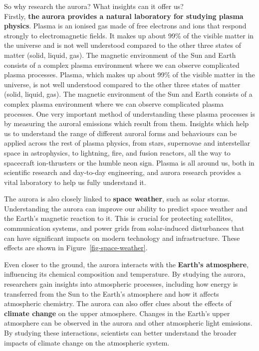 \documentclass{article}
\newcommand{\contributed}[1]{%
    \par\noindent
    \begingroup
    \setlength{\leftskip}{1em}%
    \itshape
    Contributors: #1
    \par
    \endgroup
    \vspace{0.5em}
}
\begin{document}
So why research the aurora? What insights can it offer us?\\
Firstly, \textbf{the aurora provides a natural laboratory for studying plasma physics}.
Plasma is an ionised gas made of free electrons and ions that respond strongly to electromagnetic fields. It makes up about 99\% of the visible matter in the universe and is not well understood compared to the other three states of matter (solid, liquid, gas). The magnetic environment of the Sun and Earth consists of a complex plasma environment where we can observe complicated plasma processes.
Plasma, which makes up about 99\% of the visible matter in the universe, is not well understood compared to the other three states of matter (solid, liquid, gas). The magnetic environment of the Sun and Earth consists of a complex plasma environment where we can observe complicated plasma processes. One very important method of understanding these plasma processes is by measuring the auroral emissions which result from them. Insights which help us to understand the range of different auroral forms and behaviours can be applied across the rest of plasma physics, from stars, supernovae and interstellar space in astrophysics, to lightning, fire, and fusion reactors, all the way to spacecraft ion-thrusters or the humble neon sign. Plasma is all around us, both in scientific research and day-to-day engineering, and aurora research provides a vital laboratory to help us fully understand it.

The aurora is also closely linked to \textbf{space weather}, such as solar storms. Understanding the aurora can improve our ability to predict space weather and the Earth's magnetic reaction to it. This is crucial for protecting satellites, communication systems, and power grids from solar-induced disturbances that can have significant impacts on modern technology and infrastructure. These effects are shown in Figure~\ref{fig-space-weather}.

Even closer to the ground, the aurora interacts with the \textbf{Earth's atmosphere}, influencing its chemical composition and temperature. By studying the aurora, researchers gain insights into atmospheric processes, including how energy is transferred from the Sun to the Earth's atmosphere and how it affects atmospheric chemistry. The aurora can also offer clues about the effects of \textbf{climate change} on the upper atmosphere. Changes in the Earth's upper atmosphere can be observed in the aurora and other atmospheric light emissions. By studying these interactions, scientists can better understand the broader impacts of climate change on the atmospheric system.
\end{document}
